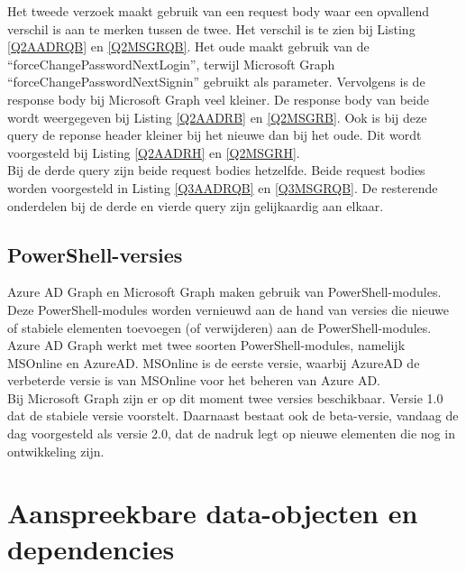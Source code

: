 Het tweede verzoek maakt gebruik van een request body waar een opvallend verschil is aan te merken tussen de twee. Het verschil is te zien bij Listing \ref{Q2AADRQB} en \ref{Q2MSGRQB}. Het oude maakt gebruik van de “forceChangePasswordNextLogin”, terwijl Microsoft Graph “forceChangePasswordNextSignin” gebruikt als parameter. Vervolgens is de response body bij Microsoft Graph veel kleiner. De response body van beide wordt weergegeven bij Listing \ref{Q2AADRB} en \ref{Q2MSGRB}. Ook is bij deze query de reponse header kleiner bij het nieuwe dan bij het oude. Dit wordt voorgesteld bij Listing \ref{Q2AADRH} en \ref{Q2MSGRH}. \\

Bij de derde query zijn beide request bodies hetzelfde. Beide request bodies worden voorgesteld in Listing \ref{Q3AADRQB} en \ref{Q3MSGRQB}. De resterende onderdelen bij de derde en vierde query zijn gelijkaardig aan elkaar.

\subsection{PowerShell-versies}


Azure \ac{AD} Graph en Microsoft Graph maken gebruik van PowerShell-modules. Deze PowerShell-modules worden vernieuwd aan de hand van versies die nieuwe of stabiele elementen toevoegen (of verwijderen) aan de PowerShell-modules. \\

Azure \ac{AD} Graph werkt met twee soorten PowerShell-modules, namelijk MSOnline en AzureAD. MSOnline is de eerste versie, waarbij AzureAD de verbeterde versie is van MSOnline voor het beheren van Azure \ac{AD}. \\

Bij Microsoft Graph zijn er op dit moment twee versies beschikbaar. Versie 1.0 dat de stabiele versie voorstelt. Daarnaast bestaat ook de beta-versie, vandaag de dag voorgesteld als versie 2.0, dat de nadruk legt op nieuwe elementen die nog in ontwikkeling zijn. \\ 


\section{Aanspreekbare data-objecten en dependencies}


